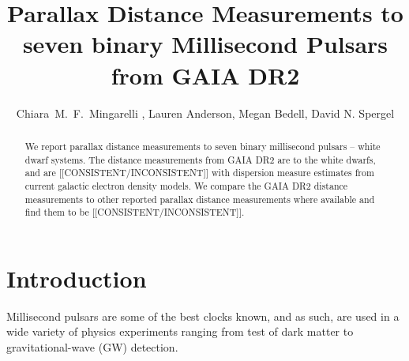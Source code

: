 \documentclass[iop,apj]{emulateapj}
\begin{document}
\title{Parallax Distance Measurements to seven binary Millisecond Pulsars from GAIA DR2}
 
\author{
Chiara~M.~F.~Mingarelli , 
Lauren Anderson,
Megan Bedell,
David N. Spergel
}



\begin{abstract}
We report parallax distance measurements to seven binary millisecond pulsars -- white dwarf systems. The distance measurements from GAIA DR2 are to the white dwarfs, and are [[CONSISTENT/INCONSISTENT]] with dispersion measure estimates from current galactic electron density models. We compare the GAIA DR2 distance measurements to other reported parallax distance measurements where available and find them to be [[CONSISTENT/INCONSISTENT]].
\end{abstract}


\section{Introduction}
\label{sec:intro}
Millisecond pulsars are some of the best clocks known, and as such, are used in a wide variety of physics experiments ranging from test of dark matter to gravitational-wave (GW) detection.
\end{document}

